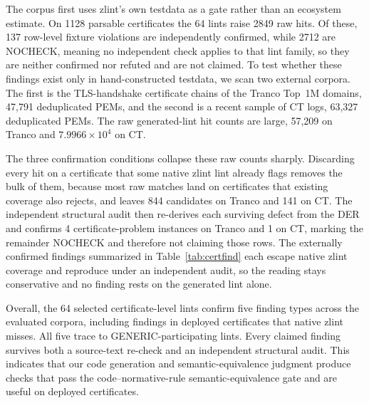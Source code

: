 The corpus first uses zlint's own testdata as a gate rather than an ecosystem
estimate. On 1128 parsable certificates the 64 lints raise 2849 raw
hits. Of these, 137 row-level fixture violations are independently confirmed,
while 2712 are NOCHECK, meaning no independent check applies to that lint family, so
they are neither confirmed nor refuted and are not claimed. To test whether these findings exist only
in hand-constructed testdata, we scan two external corpora. The first is the
TLS-handshake certificate chains of the Tranco Top~1M domains, 47,791 deduplicated
PEMs, and the second is a recent sample of CT logs, 63,327 deduplicated PEMs. The
raw generated-lint hit counts are large, 57,209 on Tranco and $7.9966\times10^4$ on CT.

The three confirmation conditions collapse these raw counts sharply. Discarding
every hit on a certificate that some native zlint lint already flags removes the
bulk of them, because most raw matches land on certificates that existing coverage
also rejects, and leaves 844 candidates on Tranco and 141 on CT. The independent
structural audit then re-derives each surviving defect from the DER and confirms 4
certificate-problem instances on Tranco and 1 on CT, marking the remainder NOCHECK
and therefore not claiming those rows. The externally confirmed findings summarized in
Table~\ref{tab:certfind} each escape native zlint coverage and reproduce under an
independent audit, so the reading stays conservative and no finding rests on the
generated lint alone.

Overall, the 64 selected certificate-level lints confirm five finding types across the evaluated
corpora, including findings in deployed certificates that native zlint misses.
All five trace to GENERIC-participating lints.
Every claimed finding survives both a source-text re-check and an independent
structural audit.
This indicates that our code generation and semantic-equivalence judgment produce checks
that pass the code--normative-rule semantic-equivalence gate and are useful on deployed
certificates.
